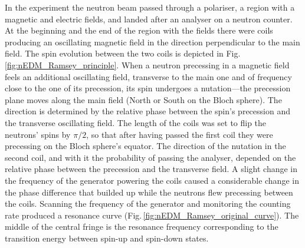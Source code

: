In the experiment the neutron beam passed through a polariser, a region with a magnetic and electric fields, and landed after an analyser on a neutron counter. At the beginning and the end of the region with the fields there were coils producing an oscillating magnetic field in the direction perpendicular to the main field. The spin evolution between the two coils is depicted in Fig.\,\ref{fig:nEDM_Ramsey_principle}. When a neutron precessing in a magnetic field feels an additional oscillating field, transverse to the main one and of frequency close to the one of its precession, its spin undergoes a nutation---the precession plane moves along the main field (North or South on the Bloch sphere). The direction is determined by the relative phase between the spin's precession and the transverse oscillating field. The length of the coils was set to flip the neutrons' spins by $\pi/2$, so that after having passed the first coil they were precessing on the Bloch sphere's equator. The direction of the nutation in the second coil, and with it the probability of passing the analyser, depended on the relative phase between the precession and the transverse field. A slight change in the frequency of the generator powering the coils caused a considerable change in the phase difference that builded up while the neutrons flew precessing between the coils. Scanning the frequency of the generator and monitoring the counting rate produced a resonance curve (Fig.\,\ref{fig:nEDM_Ramsey_original_curve}). The middle of the central fringe is the resonance frequency corresponding to the transition energy between spin-up and spin-down states.


